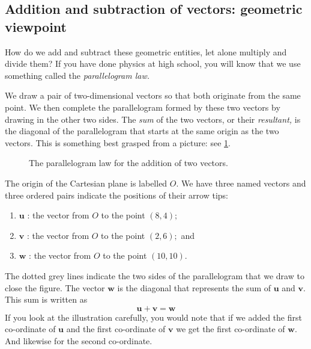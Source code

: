 \documentclass[
  a4paper,
]{article}
\providecommand{\tightlist}{%
  \setlength{\itemsep}{0pt}\setlength{\parskip}{0pt}}
\begin{document}
\hypertarget{addition-and-subtraction-of-vectors-geometric-viewpoint}{%
\subsection{Addition and subtraction of vectors: geometric
viewpoint}\label{addition-and-subtraction-of-vectors-geometric-viewpoint}}

How do we add and subtract these geometric entities, let alone multiply
and divide them? If you have done physics at high school, you will know
that we use something called the \emph{parallelogram law.}

We draw a pair of two-dimensional vectors so that both originate from
the same point. We then complete the parallelogram formed by these two
vectors by drawing in the other two sides. The \emph{sum} of the two
vectors, or their \emph{resultant,} is the diagonal of the parallelogram
that starts at the same origin as the two vectors. This is something
best grasped from a picture: see \cref{fig:vector-sum}.

\begin{figure}
\hypertarget{fig:vector-sum}{%
\centering

\caption{The parallelogram law for the addition of two
vectors.}\label{fig:vector-sum}
}
\end{figure}

The origin of the Cartesian plane is labelled \(O\). We have three named
vectors and three ordered pairs indicate the positions of their arrow
tips:

\begin{enumerate}
\tightlist
\item
  \(\symbf{u}\) : the vector from \(O\) to the point \((8, 4);\)
\item
  \(\symbf{v}\) : the vector from \(O\) to the point \((2, 6);\) and
\item
  \(\symbf{w}\) : the vector from \(O\) to the point \((10, 10)\).
\end{enumerate}

The dotted grey lines indicate the two sides of the parallelogram that
we draw to close the figure. The vector \(\symbf{w}\) is the diagonal
that represents the sum of \(\symbf{u}\) and \(\symbf{v}\). This sum is
written as \[
\symbf{u} + \symbf{v} = \symbf{w}
\] If you look at the illustration carefully, you would note that if we
added the first co-ordinate of \(\symbf{u}\) and the first co-ordinate
of \(\symbf{v}\) we get the first co-ordinate of \(\symbf{w}\). And
likewise for the second co-ordinate.
\end{document}
